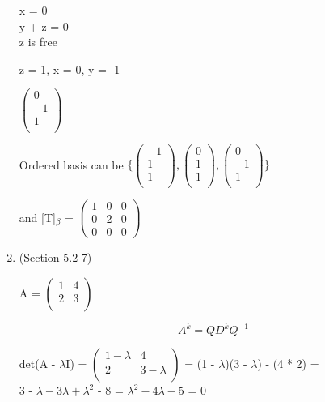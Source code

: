 \documentclass[12pt]{article}
\begin{document}
\begin{enumerate}
    x = 0 \\
    y + z = 0\\
    z is free

    z = 1, x = 0, y = -1

    $\begin{pmatrix}
        0\\
        -1 \\
        1\\
    \end{pmatrix}$

    Ordered basis can be $\{\begin{pmatrix}
        -1 \\
        1 \\
        1\\
    \end{pmatrix}, \begin{pmatrix}
        0\\
        1 \\
        1\\
    \end{pmatrix}, \begin{pmatrix}
        0\\
        -1 \\
        1\\
    \end{pmatrix}\}$ 

    and [T]$_\beta$ = $\begin{pmatrix}
        1 & 0 & 0 \\
        0 & 2 & 0 \\
        0 & 0 & 0
    \end{pmatrix}$
    
    
    \item (Section 5.2 7)

    A = $\begin{pmatrix}
        1 & 4 \\
        2 & 3 \\
    \end{pmatrix}$

    \begin{equation}
        A^k = QD^kQ^{-1}
    \end{equation}

    det(A - $\lambda$I) = $\begin{pmatrix}
        1 - \lambda & 4 \\
        2 & 3 - \lambda \\
    \end{pmatrix}$ = (1 - $\lambda$)(3 - $\lambda$) - (4 * 2) = \\
    3 - $\lambda - 3\lambda + \lambda^2$ - 8 = $\lambda^2 - 4\lambda - 5$ = 0


\end{enumerate}
\end{document}
